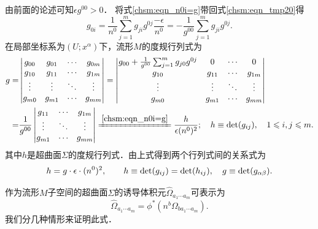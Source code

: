 由前面的论述可知$\epsilon g^{00}>0$．
将式\eqref{chsm:eqn_n0i=g}带回式\eqref{chsm:eqn_tmp20}得
\begin{equation}
    g_{0i} = \frac{1}{n^0} \sum_{j=1}^{m} g_{ji} g^{0j} \frac{-\epsilon}{n^0}
      = -\frac{1}{g^{00}} \sum_{j=1}^{m} g_{ji} g^{0j} .
\end{equation}
在局部坐标系为$(U;x^\alpha)$下，流形$M$的度规行列式为
\begin{align*}
    g=&\begin{vmatrix}
        g_{00} & g_{01} & \cdots &g_{0m} \\
        g_{10} & g_{11} & \cdots &g_{1m} \\
        \vdots & \vdots & \ddots &\vdots \\
        g_{m0} & g_{m1} & \cdots &g_{mm}
    \end{vmatrix}
    =\begin{vmatrix}
        g_{00}+\frac{1}{g^{00}} \sum_{j=1}^{m} g_{j0} g^{0j}
         & 0 & \cdots & 0 \\
        g_{10} & g_{11} & \cdots &g_{1m} \\
        \vdots & \vdots & \ddots &\vdots \\
        g_{m0} & g_{m1} & \cdots &g_{mm}
    \end{vmatrix} \notag \\
    =&\frac{1}{g^{00}}
    \begin{vmatrix}
        g_{11} & \cdots &g_{1m} \\
        \vdots & \ddots &\vdots \\
        g_{m1} & \cdots &g_{mm}
    \end{vmatrix}
    \xlongequal{\ref{chsm:eqn_n0i=g}} \frac{h}{\epsilon (n^{0})^2} ;
    \quad h\equiv{\rm det}(g_{ij}), \quad 1 \leqslant i,j \leqslant m .
\end{align*}
其中$h$是超曲面$\Sigma$的度规行列式．由上式得到两个行列式间的关系式为
\begin{equation}\label{chsm:eqn_gtg}
    h = g\cdot \epsilon \cdot  (n^{0})^2 ,
    \qquad h\equiv{\rm det}(g_{ij})={\rm det}(h_{ij}), \quad g\equiv{\rm det}(g_{\alpha\beta}) .
\end{equation}

作为流形$M$子空间的超曲面$\Sigma$的{\heiti 诱导体积元}$\hat{\Omega}_{a_1 \cdots a_{m}}$可表示为
\begin{equation}\label{chsm:eqn_induced-VE}
    \hat{\Omega}_{a_1 \cdots a_{m}}= \phi^*( n^b \Omega_{b a_1 \cdots a_m} ).
\end{equation}
我们分几种情形来证明此式．

